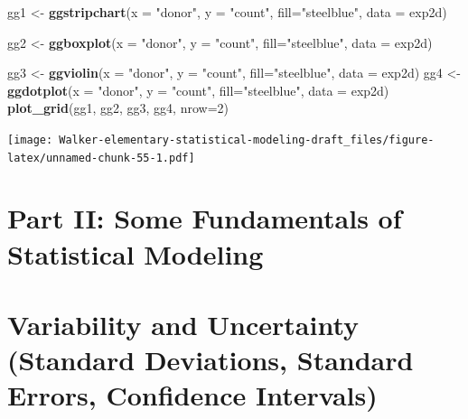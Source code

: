 \documentclass[]{book}
\newenvironment{Shaded}{\begin{snugshade}}{\end{snugshade}}
\newcommand{\DataTypeTok}[1]{\textcolor[rgb]{0.13,0.29,0.53}{#1}}
\newcommand{\DecValTok}[1]{\textcolor[rgb]{0.00,0.00,0.81}{#1}}
\newcommand{\KeywordTok}[1]{\textcolor[rgb]{0.13,0.29,0.53}{\textbf{#1}}}
\newcommand{\NormalTok}[1]{#1}
\newcommand{\StringTok}[1]{\textcolor[rgb]{0.31,0.60,0.02}{#1}}
\begin{document}
\begin{Shaded}
\begin{Highlighting}[]
\NormalTok{gg1 <-}\StringTok{ }\KeywordTok{ggstripchart}\NormalTok{(}\DataTypeTok{x =} \StringTok{"donor"}\NormalTok{,}
          \DataTypeTok{y =} \StringTok{"count"}\NormalTok{,}
          \DataTypeTok{fill=}\StringTok{"steelblue"}\NormalTok{,}
          \DataTypeTok{data =}\NormalTok{ exp2d)}

\NormalTok{gg2 <-}\StringTok{ }\KeywordTok{ggboxplot}\NormalTok{(}\DataTypeTok{x =} \StringTok{"donor"}\NormalTok{,}
          \DataTypeTok{y =} \StringTok{"count"}\NormalTok{,}
          \DataTypeTok{fill=}\StringTok{"steelblue"}\NormalTok{,}
          \DataTypeTok{data =}\NormalTok{ exp2d)}

\NormalTok{gg3 <-}\StringTok{ }\KeywordTok{ggviolin}\NormalTok{(}\DataTypeTok{x =} \StringTok{"donor"}\NormalTok{,}
          \DataTypeTok{y =} \StringTok{"count"}\NormalTok{,}
          \DataTypeTok{fill=}\StringTok{"steelblue"}\NormalTok{,}
          \DataTypeTok{data =}\NormalTok{ exp2d)}
\NormalTok{gg4 <-}\StringTok{ }\KeywordTok{ggdotplot}\NormalTok{(}\DataTypeTok{x =} \StringTok{"donor"}\NormalTok{,}
          \DataTypeTok{y =} \StringTok{"count"}\NormalTok{,}
          \DataTypeTok{fill=}\StringTok{"steelblue"}\NormalTok{,}
          \DataTypeTok{data =}\NormalTok{ exp2d)}
\KeywordTok{plot_grid}\NormalTok{(gg1, gg2, gg3, gg4, }\DataTypeTok{nrow=}\DecValTok{2}\NormalTok{)}
\end{Highlighting}
\end{Shaded}

\texttt{[image: Walker-elementary-statistical-modeling-draft\_files/figure-latex/unnamed-chunk-55-1.pdf]}

\hypertarget{part-ii-some-fundamentals-of-statistical-modeling}{%
\chapter*{Part II: Some Fundamentals of Statistical Modeling}\label{part-ii-some-fundamentals-of-statistical-modeling}}

\hypertarget{variability-and-uncertainty-standard-deviations-standard-errors-confidence-intervals}{%
\chapter{Variability and Uncertainty (Standard Deviations, Standard Errors, Confidence Intervals)}\label{variability-and-uncertainty-standard-deviations-standard-errors-confidence-intervals}}
\end{document}
